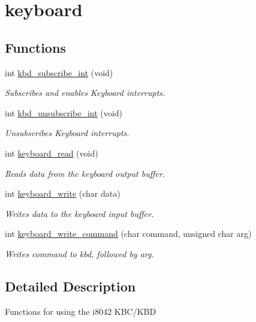 \hypertarget{group__keyboard}{}\section{keyboard}
\label{group__keyboard}
\subsection*{Functions}
\begin{DoxyCompactItemize}
\item 
int \hyperlink{group__keyboard_gafba3a35bd6a79305e84ab4f33a5ffa7f}{kbd\+\_\+subscribe\+\_\+int} (void)
\begin{DoxyCompactList}\small\item\em Subscribes and enables Keyboard interrupts. \end{DoxyCompactList}\item 
int \hyperlink{group__keyboard_ga162d7647d3af99ebea80b15778ce5b5d}{kbd\+\_\+unsubscribe\+\_\+int} (void)
\begin{DoxyCompactList}\small\item\em Unsubscribes Keyboard interrupts. \end{DoxyCompactList}\item 
int \hyperlink{group__keyboard_gacd2bc10465c70dbb99210f880bc18207}{keyboard\+\_\+read} (void)
\begin{DoxyCompactList}\small\item\em Reads data from the keyboard output buffer. \end{DoxyCompactList}\item 
int \hyperlink{group__keyboard_ga26c2eb6181cabae35aff87fc387de0e9}{keyboard\+\_\+write} (char data)
\begin{DoxyCompactList}\small\item\em Writes data to the keyboard input buffer. \end{DoxyCompactList}\item 
int \hyperlink{group__keyboard_ga279ddeca4cafee5084a0eec40e28d223}{keyboard\+\_\+write\+\_\+command} (char command, unsigned char arg)
\begin{DoxyCompactList}\small\item\em Writes command to kbd, followed by arg. \end{DoxyCompactList}\end{DoxyCompactItemize}


\subsection{Detailed Description}
Functions for using the i8042 K\+B\+C/\+K\+BD 

